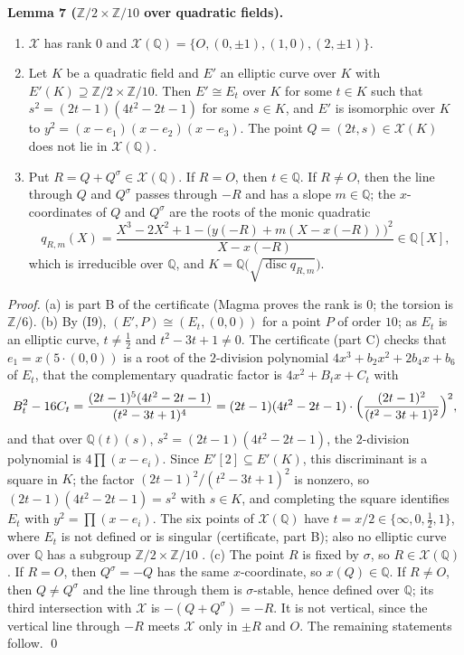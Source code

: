 \documentclass[11pt]{article}
\newenvironment{statement}[1]{\par\medskip\noindent\phantomsection\textbf{#1}\ }{\par\medskip}
\newcommand{\Q}{\mathbb Q}
\newcommand{\Z}{\mathbb Z}
\DeclareMathOperator{\disc}{disc}
\begin{document}
\begin{statement}{Lemma 7 (\(\Z/2\times\Z/10\) over quadratic fields).}\label{lemma-x110}
\begin{enumerate}
\item[(a)] \(\mathcal X\) has rank \(0\) and \(\mathcal X(\Q)=\{O,(0,\pm1),(1,0),(2,\pm1)\}\).
\item[(b)] Let \(K\) be a quadratic field and \(E'\) an elliptic curve over \(K\) with
\(E'(K)\supseteq\Z/2\times\Z/10\). Then \(E'\cong E_t\) over \(K\) for some \(t\in K\) such that
\(s^2=(2t-1)(4t^2-2t-1)\) for some \(s\in K\), and \(E'\) is isomorphic over \(K\) to
\(y^2=(x-e_1)(x-e_2)(x-e_3)\). The point \(Q=(2t,s)\in\mathcal X(K)\) does not lie in
\(\mathcal X(\Q)\).
\item[(c)] Put \(R=Q+Q^\sigma\in\mathcal X(\Q)\). If \(R=O\), then \(t\in\Q\). If \(R\neq O\), then
the line through \(Q\) and \(Q^\sigma\) passes through \(-R\) and has a slope \(m\in\Q\); the
\(x\)-coordinates of \(Q\) and \(Q^\sigma\) are the roots of the monic quadratic
\[q_{R,m}(X)=\frac{X^3-2X^2+1-\bigl(y(-R)+m(X-x(-R))\bigr)^2}{X-x(-R)}\in\Q[X],\]
which is irreducible over \(\Q\), and \(K=\Q\bigl(\sqrt{\disc q_{R,m}}\bigr)\).
\end{enumerate}
\end{statement}

\emph{Proof.} (a) is part B of the certificate (Magma proves the rank is \(0\); the torsion is
\(\Z/6\)). (b) By (I9), \((E',P)\cong(E_t,(0,0))\) for a point \(P\) of order \(10\); as \(E_t\) is
an elliptic curve, \(t\neq\tfrac12\) and \(t^2-3t+1\neq0\). The certificate (part C) checks that
\(e_1=x(5\cdot(0,0))\) is a root of the \(2\)-division polynomial \(4x^3+b_2x^2+2b_4x+b_6\) of
\(E_t\), that the complementary quadratic factor is \(4x^2+B_tx+C_t\) with
\[B_t^2-16C_t=\frac{(2t-1)^5(4t^2-2t-1)}{(t^2-3t+1)^4}
=(2t-1)(4t^2-2t-1)\cdot\Bigl(\frac{(2t-1)^2}{(t^2-3t+1)^2}\Bigr)^2,\]
and that over \(\Q(t)(s)\), \(s^2=(2t-1)(4t^2-2t-1)\), the \(2\)-division polynomial is
\(4\prod(x-e_i)\). Since \(E'[2]\subseteq E'(K)\), this discriminant is a square in \(K\); the
factor \((2t-1)^2/(t^2-3t+1)^2\) is nonzero, so \((2t-1)(4t^2-2t-1)=s^2\) with \(s\in K\), and
completing the square identifies \(E_t\) with \(y^2=\prod(x-e_i)\). The six
points of \(\mathcal X(\Q)\) have \(t=x/2\in\{\infty,0,\tfrac12,1\}\), where \(E_t\) is not
defined or is singular (certificate, part B); also no elliptic curve over \(\Q\) has a subgroup
\(\Z/2\times\Z/10\) \cite{Ma}. (c) The point \(R\) is fixed by \(\sigma\), so \(R\in\mathcal X(\Q)\).
If \(R=O\), then \(Q^\sigma=-Q\) has the same \(x\)-coordinate, so \(x(Q)\in\Q\). If \(R\neq O\),
then \(Q\neq Q^\sigma\) and the line through them is \(\sigma\)-stable, hence defined over \(\Q\);
its third intersection with \(\mathcal X\) is \(-(Q+Q^\sigma)=-R\). It is not vertical, since the
vertical line through \(-R\) meets \(\mathcal X\) only in \(\pm R\) and \(O\). The remaining
statements follow. \qed
\end{document}
